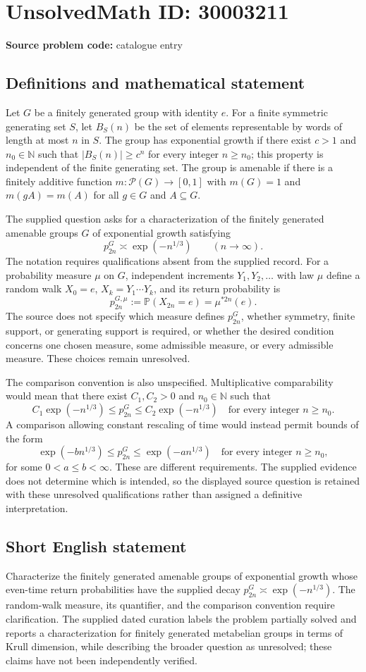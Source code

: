 \documentclass[11pt]{article}
\newcommand{\N}{\mathbb{N}}
\begin{document}
\section*{UnsolvedMath ID: 30003211}
\textbf{Source problem code:} catalogue entry
\subsection{Definitions and mathematical statement}
Let \(G\) be a finitely generated group with identity \(e\). For a finite symmetric generating set \(S\), let \(B_S(n)\) be the set of elements representable by words of length at most \(n\) in \(S\). The group has exponential growth if there exist \(c>1\) and \(n_0\in\N\) such that \(|B_S(n)|\ge c^n\) for every integer \(n\ge n_0\); this property is independent of the finite generating set. The group is amenable if there is a finitely additive function \(m:\mathcal P(G)\to[0,1]\) with \(m(G)=1\) and \(m(gA)=m(A)\) for all \(g\in G\) and \(A\subseteq G\).

The supplied question asks for a characterization of the finitely generated amenable groups \(G\) of exponential growth satisfying
\[
 p^G_{2n}\asymp\exp(-n^{1/3})\qquad(n\to\infty).
\]
The notation requires qualifications absent from the supplied record. For a probability measure \(\mu\) on \(G\), independent increments \(Y_1,Y_2,\ldots\) with law \(\mu\) define a random walk \(X_0=e\), \(X_k=Y_1\cdots Y_k\), and its return probability is
\[
 p^{G,\mu}_{2n}:=\mathbb P(X_{2n}=e)=\mu^{*2n}(e).
\]
The source does not specify which measure defines \(p^G_{2n}\), whether symmetry, finite support, or generating support is required, or whether the desired condition concerns one chosen measure, some admissible measure, or every admissible measure. These choices remain unresolved.

The comparison convention is also unspecified. Multiplicative comparability would mean that there exist \(C_1,C_2>0\) and \(n_0\in\N\) such that
\[
 C_1\exp(-n^{1/3})\le p^G_{2n}\le C_2\exp(-n^{1/3})
 \quad\text{for every integer }n\ge n_0.
\]
A comparison allowing constant rescaling of time would instead permit bounds of the form
\[
 \exp(-b n^{1/3})\le p^G_{2n}\le\exp(-a n^{1/3})
 \quad\text{for every integer }n\ge n_0,
\]
for some \(0<a\le b<\infty\). These are different requirements. The supplied evidence does not determine which is intended, so the displayed source question is retained with these unresolved qualifications rather than assigned a definitive interpretation.
\subsection{Short English statement}
Characterize the finitely generated amenable groups of exponential growth whose even-time return probabilities have the supplied decay \(p^G_{2n}\asymp\exp(-n^{1/3})\). The random-walk measure, its quantifier, and the comparison convention require clarification. The supplied dated curation labels the problem partially solved and reports a characterization for finitely generated metabelian groups in terms of Krull dimension, while describing the broader question as unresolved; these claims have not been independently verified.
\end{document}
